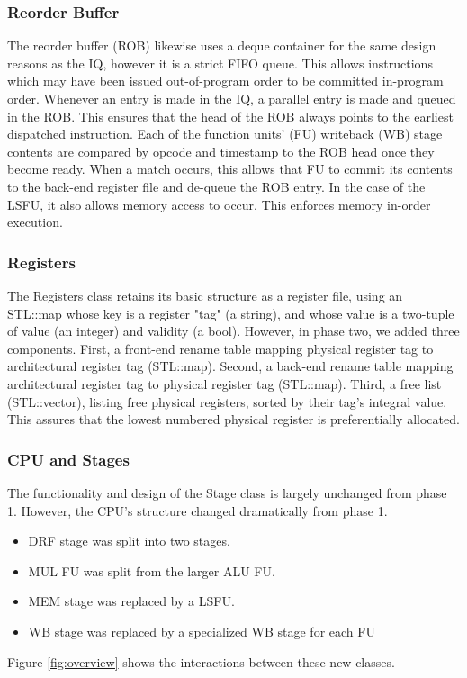 \documentclass[12pt]{article}
\begin{document}
\subsubsection{Reorder Buffer}
The reorder buffer (ROB) likewise uses a deque container for the same design reasons as the IQ, however it is a strict FIFO queue. 
This allows instructions which may have been issued out-of-program order to be committed in-program order. 
Whenever an entry is made in the IQ, a parallel entry is made and queued in the ROB. 
This ensures that the head of the ROB always points to the earliest dispatched instruction. 
Each of the function units' (FU) writeback (WB) stage contents are compared by opcode and timestamp to the ROB head once they become ready. 
When a match occurs, this allows that FU to commit its contents to the back-end register file and de-queue the ROB entry. 
In the case of the LSFU, it also allows memory access to occur.
This enforces memory in-order execution.

\subsubsection{Registers}
The Registers class retains its basic structure as a register file, using an STL::map whose key is a register "tag" (a string), and whose value is a two-tuple of value (an integer) and validity (a bool).
However, in phase two, we added three components.
First, a front-end rename table mapping physical register tag to architectural register tag (STL::map).
Second, a back-end rename table mapping architectural register tag to physical register tag (STL::map).
Third, a free list (STL::vector), listing free physical registers, sorted by their tag's integral value.
This assures that the lowest numbered physical register is preferentially allocated.

\subsubsection{CPU and Stages}
The functionality and design of the Stage class is largely unchanged from phase 1. 
However, the CPU's structure changed dramatically from phase 1.
\begin{itemize}
  \item DRF stage was split into two stages.
  \item MUL FU was split from the larger ALU FU.
  \item MEM stage was replaced by a LSFU.
  \item WB stage was replaced by a specialized WB stage for each FU
\end{itemize}
Figure \ref{fig:overview} shows the interactions between these new classes.
\end{document}
